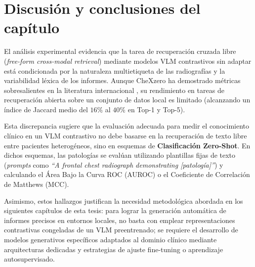 \documentclass[../tesis.tex]{subfiles}
\begin{document}
\begin{table}[htbp]
\centering
\small
{}
\caption{Desempeño de recuperación tras aplicar la estrategia de balanceo por Selección Codiciosa por Minorías.}
\label{tab:retrieval_resultados_balanceados}
\end{table}

\section{Discusión y conclusiones del capítulo}
\label{sec:discusion_ch2}

El análisis experimental evidencia que la tarea de recuperación cruzada libre (\textit{free-form cross-modal retrieval}) mediante modelos VLM contrastivos sin adaptar está condicionada por la naturaleza multietiqueta de las radiografías y la variabilidad léxica de los informes. Aunque CheXzero ha demostrado métricas sobresalientes en la literatura internacional \citep{CheXzero, Tiu_et_al._2022}, su rendimiento en tareas de recuperación abierta sobre un conjunto de datos local es limitado (alcanzando un índice de Jaccard medio del $16\%$ al $40\%$ en Top-1 y Top-5).

Esta discrepancia sugiere que la evaluación adecuada para medir el conocimiento clínico en un VLM contrastivo no debe basarse en la recuperación de texto libre entre pacientes heterogéneos, sino en esquemas de \textbf{Clasificación Zero-Shot}. En dichos esquemas, las patologías se evalúan utilizando plantillas fijas de texto (\textit{prompts} como \textit{``A frontal chest radiograph demonstrating [patología]''}) y calculando el Área Bajo la Curva ROC (AUROC) o el Coeficiente de Correlación de Matthews (MCC).

Asimismo, estos hallazgos justifican la necesidad metodológica abordada en los siguientes capítulos de esta tesis: para lograr la generación automática de informes precisos en entornos locales, no basta con emplear representaciones contrastivas congeladas de un VLM preentrenado; se requiere el desarrollo de modelos generativos específicos adaptados al dominio clínico mediante arquitecturas dedicadas y estrategias de ajuste fine-tuning o aprendizaje autosupervisado.
\end{document}
